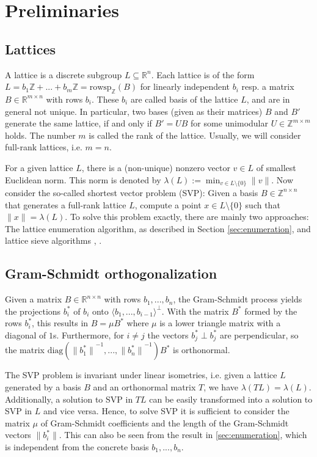 \documentclass{scrartcl}
\newcommand{\Z}{\mathbb{Z}}
\newcommand{\R}{\mathbb{R}}
\begin{document}
    \section{Preliminaries}

    \subsection{Lattices}

    A lattice is a discrete subgroup $L \subseteq \R^n$. Each lattice is of the form $L = b_1 \Z + ... + b_m \Z = \mathrm{rowsp}_{\Z}(B)$ for linearly independent $b_i$ resp. a matrix $B \in \R^{m \times n}$ with rows $b_i$. 
    These $b_i$ are called basis of the lattice $L$, and are in general not unique. 
    In particular, two bases (given as their matrices) $B$ and $B'$ generate the same lattice, if and only if $B' = UB$ for some unimodular $U \in \Z^{m \times m}$ holds.
    The number $m$ is called the rank of the lattice. Usually, we will consider full-rank lattices, i.e. $m = n$.

    For a given lattice $L$, there is a (non-unique) nonzero vector $v \in L$ of smallest Euclidean norm. This norm is denoted by $\lambda(L) := \min_{v \in L \setminus \{0\}} \| v \|$. 
    Now consider the so-called shortest vector problem (SVP): Given a basis $B \in \Z^{n \times n}$ that generates a full-rank lattice $L$, compute a point $x \in L \setminus \{0\}$ such that $\| x \| = \lambda(L)$. 
    To solve this problem exactly, there are mainly two approaches: The lattice enumeration algorithm, as described in Section \ref{sec:enumeration}, and lattice sieve algorithms \cite{sieve}, \cite{g6k}.

    \subsection{Gram-Schmidt orthogonalization}

    Given a matrix $B \in \R^{n \times n}$ with rows $b_1, ..., b_n$, the Gram-Schmidt process yields the projections $b^*_i$ of $b_i$ onto $\langle b_1, ..., b_{i - 1} \rangle ^ \perp$. With the matrix $B^*$ formed by the rows $b^*_i$, this results in $B = \mu B^*$ where $\mu$ is a lower triangle matrix with a diagonal of $1$s. Furthermore, for $i \neq j$ the vectors $b^*_j \perp b^*_j$ are perpendicular, so the matrix $\mathrm{diag}( {\|b^*_1\|}^{-1}, ..., {\|b^*_n\|}^{-1} ) B^*$ is orthonormal.

    The SVP problem is invariant under linear isometries, i.e. given a lattice $L$ generated by a basis $B$ and an orthonormal matrix $T$, we have $\lambda(TL) = \lambda(L)$. Additionally, a solution to SVP in $TL$ can be easily transformed into a solution to SVP in $L$ and vice versa.
    Hence, to solve SVP it is sufficient to consider the matrix $\mu$ of Gram-Schmidt coefficients and the length of the Gram-Schmidt vectors $\| b^*_i \|$. This can also be seen from the result in \ref{sec:enumeration}, which is independent from the concrete basis $b_1, ..., b_n$.
\end{document}
